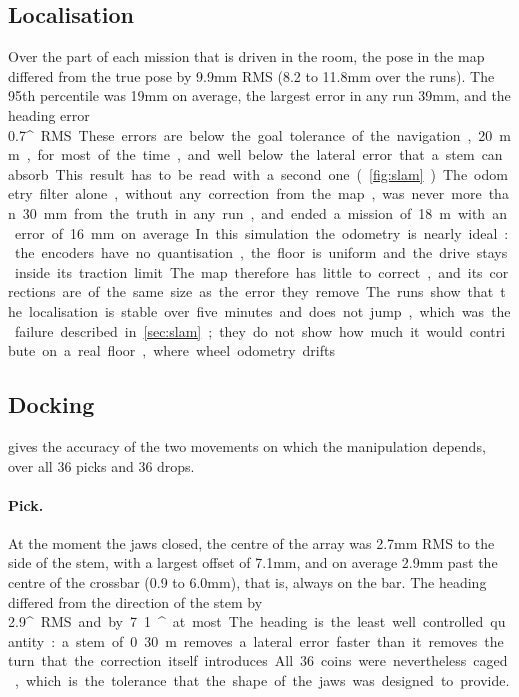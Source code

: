\figline

\subsection{Localisation}
\label{sec:res-slam}
Over the part of each mission that is driven in the room, the pose in the map differed
from the true pose by 9.9\unit{mm} RMS (8.2 to 11.8\unit{mm} over the runs). The 95th
percentile was 19\unit{mm} on average, the largest error in any run 39\unit{mm}, and the
heading error 0.7\unit{^\circ} RMS. These errors are below the goal tolerance of the
navigation, 20\unit{mm}, for most of the time, and well below the lateral error that a stem
can absorb.

This result has to be read with a second one (\cref{fig:slam}). The odometry filter alone,
without any correction from the map, was never more than 30\unit{mm} from the truth in any
run, and ended a mission of 18\unit{m} with an error of 16\unit{mm} on average. In this
simulation the odometry is nearly ideal: the encoders have no quantisation, the floor is
uniform and the drive stays inside its traction limit. The map therefore has little to
correct, and its corrections are of the same size as the error they remove. The runs show
that the localisation is stable over five minutes and does not jump, which was the failure
described in \cref{sec:slam}; they do not show how much it would contribute on a real
floor, where wheel odometry drifts.

\figslam

\subsection{Docking}
\label{sec:res-dock}
 gives the accuracy of the two movements on which the manipulation depends,
over all 36 picks and 36 drops.

\paragraph{Pick.} At the moment the jaws closed, the centre of the array was 2.7\unit{mm}
RMS to the side of the stem, with a largest offset of 7.1\unit{mm}, and on average
2.9\unit{mm} past the centre of the crossbar (0.9 to 6.0\unit{mm}), that is, always on the
bar. The heading differed from the direction of the stem by 2.9\unit{^\circ} RMS and by
7.1\unit{^\circ} at most. The heading is the least well controlled quantity: a stem of
0.30\unit{m} removes a lateral error faster than it removes the turn that the correction
itself introduces. All 36 coins were nevertheless caged, which is the tolerance that the
shape of the jaws was designed to provide.


